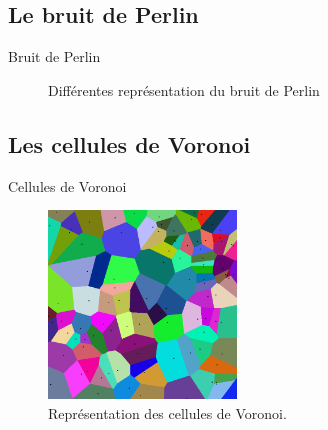 \documentclass{beamer}
\begin{document}
\subsection{Le bruit de Perlin}
\begin{frame}{Bruit de Perlin}
  \begin{center}
    \begin{figure}
      \caption{Différentes représentation du bruit de Perlin}
    \end{figure}
  \end{center}
\end{frame}

\subsection{Les cellules de Voronoi}
\begin{frame}{Cellules de Voronoi}
  \begin{center}
    \begin{figure}
      \includegraphics[width=5cm]{Images/Images_Alexis/voronoi.png}
      \caption{Représentation des cellules de Voronoi.}
    \end{figure}
  \end{center}
\end{frame}
\end{document}
